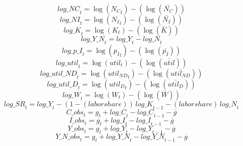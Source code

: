 \begin{dmath}
{log\_NC}_{t}=\log\left({{N_C}}_{t}\right)-(\log\left(\bar{{N_C}}\right))
\end{dmath}
\begin{dmath}
{log\_NI}_{t}=\log\left({{N_I}}_{t}\right)-(\log\left(\bar{{N_I}}\right))
\end{dmath}
\begin{dmath}
{log\_K}_{t}=\log\left({{K}}_{t}\right)-(\log\left(\bar{{K}}\right))
\end{dmath}
\begin{dmath}
{log\_Y\_N}_{t}={log\_Y}_{t}-{log\_N}_{t}
\end{dmath}
\begin{dmath}
{log\_p\_I}_{t}=\log\left({{p_I}}_{t}\right)-(\log\left(\bar{{p_I}}\right))
\end{dmath}
\begin{dmath}
{log\_util}_{t}=\log\left({{util}}_{t}\right)-(\log\left(\bar{{util}}\right))
\end{dmath}
\begin{dmath}
{log\_util\_ND}_{t}=\log\left({{util_{ND}}}_{t}\right)-(\log\left(\bar{{util_{ND}}}\right))
\end{dmath}
\begin{dmath}
{log\_util\_D}_{t}=\log\left({{util_D}}_{t}\right)-(\log\left(\bar{{util_D}}\right))
\end{dmath}
\begin{dmath}
{log\_W}_{t}=\log\left({{W}}_{t}\right)-(\log\left(\bar{{W}}\right))
\end{dmath}
\begin{dmath}
{log\_SR}_{t}={log\_Y}_{t}-\left(1-{(labor share)}\right)\, {log\_K}_{t-1}-{(labor share)}\, {log\_N}_{t}
\end{dmath}
\begin{dmath}
{C\_obs}_{t}={{g}}_{t}+{log\_C}_{t}-{log\_C}_{t-1}-{{\overline{g}}}
\end{dmath}
\begin{dmath}
{I\_obs}_{t}={{g}}_{t}+{log\_I}_{t}-{log\_I}_{t-1}-{{\overline{g}}}
\end{dmath}
\begin{dmath}
{Y\_obs}_{t}={{g}}_{t}+{log\_Y}_{t}-{log\_Y}_{t-1}-{{\overline{g}}}
\end{dmath}
\begin{dmath}
{Y\_N\_obs}_{t}={{g}}_{t}+{log\_Y\_N}_{t}-{log\_Y\_N}_{t-1}-{{\overline{g}}}
\end{dmath}
